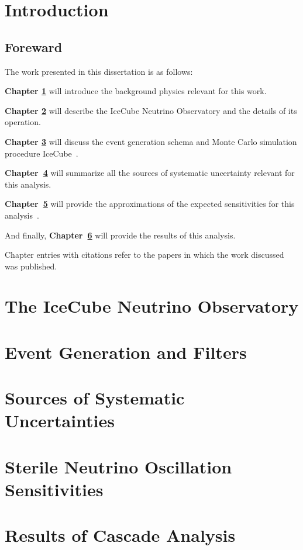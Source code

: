 \documentclass[
11pt, 
english, 
doublespacing, %
headsepline, %
usenames,dvipsnames
]{dissertation_class} %
\numberwithin{figure}{section}
\numberwithin{table}{section}
\numberwithin{equation}{section}
\begin{document}
\tableofcontents

\chapter{Introduction}\label{chapter:intro}
\section{Foreward}

The work presented in this dissertation is as follows:

\textbf{Chapter \ref{chapter:intro}} will introduce the background physics relevant for this work. 

\textbf{Chapter \ref{chapter:icecube}} will describe the IceCube Neutrino Observatory and the details of its operation. 

\textbf{Chapter \ref{chapter:gen}} will discuss the event generation schema and Monte Carlo simulation procedure IceCube~\cite{ABBASI2021108018}.

\textbf{Chapter~\ref{chapter:unc}} will summarize all the sources of systematic uncertainty relevant for this analysis.

\textbf{Chapter~\ref{chapter:sense}} will provide the approximations of the expected sensitivities for this analysis~\cite{PhysRevD.105.052001}. 

And finally,\textbf{ Chapter~\ref{chapter:res}} will provide the results of this analysis. 

Chapter entries with citations refer to the papers in which the work discussed was published.



\chapter{The IceCube Neutrino Observatory}\label{chapter:icecube}


\chapter{Event Generation and Filters}\label{chapter:gen}


\chapter{Sources of Systematic Uncertainties}\label{chapter:unc}

\chapter{Sterile Neutrino Oscillation Sensitivities}\label{chapter:sense}

\chapter{Results of Cascade Analysis}\label{chapter:res}


% 

% 


\end{document}
